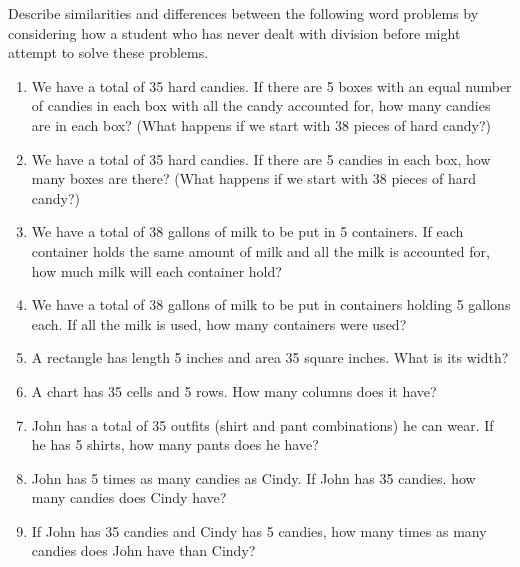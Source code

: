 \documentclass{ximera}
\begin{document}
\begin{problem}
Describe similarities and differences between the following word problems by considering how a student who has never dealt with division before might attempt to solve these problems.

\begin{enumerate}
\item We have a total of 35 hard candies.  If there are 5 boxes with an equal number of candies in each box with all the candy accounted for, how many candies are in each box? (What happens if we start with 38 pieces of hard candy?)

\item We have a total of 35 hard candies.  If there are 5 candies in each box, how many boxes are there? (What happens if we start with 38 pieces of hard candy?)

\item We have a total of 38 gallons of milk to be put in 5 containers.  If each container holds the same amount of milk and all the milk is accounted for, how much milk will each container hold?

\item We have a total of 38 gallons of milk to be put in containers holding 5 gallons each.  If all the milk is used, how many containers were used?


\item  A rectangle has length 5 inches and area 35 square inches.  What is its width?


\item  A chart has 35 cells and 5 rows.  How many columns does it have?


\item John has a total of 35 outfits (shirt and pant combinations) he can wear.  If he has 5 shirts, how many pants does he have?

\item John has 5 times as many candies as Cindy.  If John has 35 candies. how many candies does Cindy have?
\item If John has 35 candies and Cindy has 5 candies, how many times as many candies does John have than Cindy?
\end{enumerate}

\end{problem}
\end{document}
